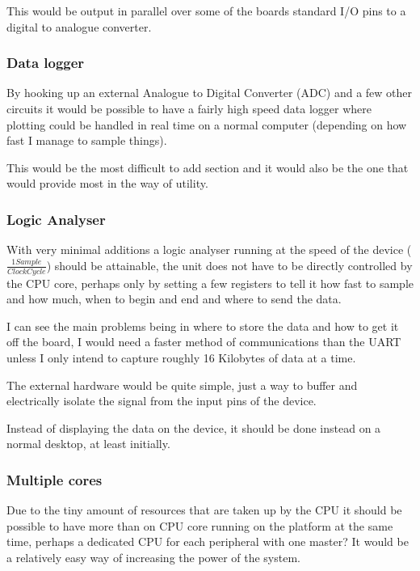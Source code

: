 \documentclass	[a4paper, 10pt]	{article}
\begin{document}
      This would be output in parallel over some of the boards standard I/O pins
      to a digital to analogue converter.

      \subsubsection{Data logger}

      By hooking up an external Analogue to Digital Converter (ADC) and a few other
      circuits it would be possible to have a fairly high speed data logger where
      plotting could be handled in real time on a normal computer (depending on how
      fast I manage to sample things).

      This would be the most difficult to add section and it would also be the one
      that would provide most in the way of utility.

      \subsubsection{Logic Analyser}

      With very minimal additions a logic analyser running at the speed of the device
      ($\frac{1 Sample}{Clock Cycle}$) should be attainable, the unit does not have
      to be directly controlled by the CPU core, perhaps only by setting a few registers
      to tell it how fast to sample and how much, when to begin and end and where to
      send the data.

      I can see the main problems being in where to store the data and how to get it
      off the board, I would need a faster method of communications than the UART
      unless I only intend to capture roughly 16 Kilobytes of data at a time.

      The external hardware would be quite simple, just a way to buffer and electrically
      isolate the signal from the input pins of the device.

      Instead of displaying the data on the device, it should be done instead on a
      normal desktop, at least initially.

      \subsubsection{Multiple cores}

      Due to the tiny amount of resources that are taken up by the CPU it should be
      possible to have more than on CPU core running on the platform at the same
      time, perhaps a dedicated CPU for each peripheral with one master? It would
      be a relatively easy way of increasing the power of the system.
\end{document}
